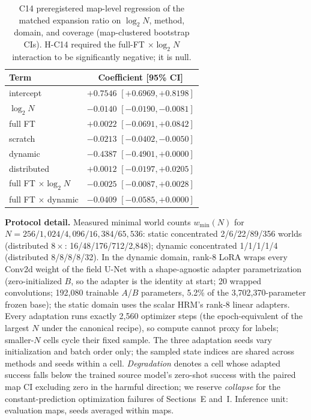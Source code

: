 \documentclass[letterpaper]{article} %
\newcommand{\stage}[1]{\textsc{#1}}
\begin{document}
\begin{table}[t]
\centering
\small
\setlength{\tabcolsep}{3pt}
\begin{tabular}{@{}lc@{}}
\toprule
Term & Coefficient [95\% CI] \\
\midrule
intercept & $+0.7546$ $[+0.6969, +0.8198]$ \\
$\log_2 N$ & $-0.0140$ $[-0.0190, -0.0081]$ \\
full FT & $+0.0022$ $[-0.0691, +0.0842]$ \\
scratch & $-0.0213$ $[-0.0402, -0.0050]$ \\
dynamic & $-0.4387$ $[-0.4901, +0.0000]$ \\
distributed & $+0.0012$ $[-0.0197, +0.0205]$ \\
full FT $\times \log_2 N$ & $-0.0025$ $[-0.0087, +0.0028]$ \\
full FT $\times$ dynamic & $-0.0409$ $[-0.0585, +0.0000]$ \\
\bottomrule
\end{tabular}
\caption{\stage{C14} preregistered map-level regression of the matched expansion ratio on $\log_2 N$, method, domain, and coverage (map-clustered bootstrap CIs). H-C14 required the full-FT $\times \log_2 N$ interaction to be significantly negative; it is null.}
\label{tab:c14reg}
\end{table}

\textbf{Protocol detail.} Measured minimal world counts $w_{\min}(N)$ for $N{=}256/1{,}024/4{,}096/16{,}384/65{,}536$: static concentrated 2/6/22/89/356 worlds (distributed $8\times$: 16/48/176/712/2{,}848); dynamic concentrated 1/1/1/1/4 (distributed 8/8/8/8/32). In the dynamic domain, rank-8 LoRA wraps every Conv2d weight of the field U-Net with a shape-agnostic adapter parametrization (zero-initialized $B$, so the adapter is the identity at start; 20 wrapped convolutions; 192{,}080 trainable $A$/$B$ parameters, 5.2\% of the 3{,}702{,}370-parameter frozen base); the static domain uses the scalar HRM's rank-8 linear adapters. Every adaptation runs exactly 2{,}560 optimizer steps (the epoch-equivalent of the largest $N$ under the canonical recipe), so compute cannot proxy for labels; smaller-$N$ cells cycle their fixed sample. The three adaptation seeds vary initialization and batch order only; the sampled state indices are shared across methods and seeds within a cell. \emph{Degradation} denotes a cell whose adapted success falls below the trained source model's zero-shot success with the paired map CI excluding zero in the harmful direction; we reserve \emph{collapse} for the constant-prediction optimization failures of Sections~E and~I. Inference unit: evaluation maps, seeds averaged within maps.
\end{document}

